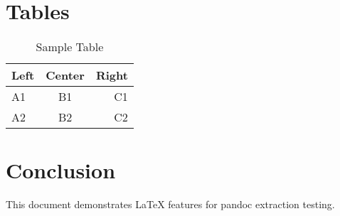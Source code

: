 \documentclass{article}
\begin{document}
\section{Tables}

\begin{table}[h]
\centering
\begin{tabular}{|l|c|r|}
\hline
Left & Center & Right \\
\hline
A1 & B1 & C1 \\
A2 & B2 & C2 \\
\hline
\end{tabular}
\caption{Sample Table}
\end{table}

\section{Conclusion}

This document demonstrates LaTeX features for pandoc extraction testing.



\end{document}

